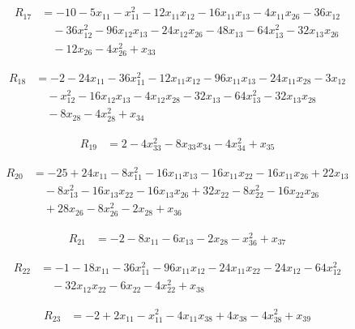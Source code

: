 \begin{align*}
R_{17} &= -10 -5 x_{11} -x_{11}^{2} -12 x_{11} x_{12} -16 x_{11} x_{13} -4 x_{11} x_{26} -36 x_{12} \\
&\quad -36 x_{12}^{2} -96 x_{12} x_{13} -24 x_{12} x_{26} -48 x_{13} -64 x_{13}^{2} -32 x_{13} x_{26} \\
&\quad -12 x_{26} -4 x_{26}^{2} +x_{33}
\end{align*}

\begin{align*}
R_{18} &= -2 -24 x_{11} -36 x_{11}^{2} -12 x_{11} x_{12} -96 x_{11} x_{13} -24 x_{11} x_{28} -3 x_{12} \\
&\quad -x_{12}^{2} -16 x_{12} x_{13} -4 x_{12} x_{28} -32 x_{13} -64 x_{13}^{2} -32 x_{13} x_{28} \\
&\quad -8 x_{28} -4 x_{28}^{2} +x_{34}
\end{align*}

\begin{align*}
R_{19} &= 2 -4 x_{33}^{2} -8 x_{33} x_{34} -4 x_{34}^{2} +x_{35}
\end{align*}

\begin{align*}
R_{20} &= -25 +24 x_{11} -8 x_{11}^{2} -16 x_{11} x_{13} -16 x_{11} x_{22} -16 x_{11} x_{26} +22 x_{13} \\
&\quad -8 x_{13}^{2} -16 x_{13} x_{22} -16 x_{13} x_{26} +32 x_{22} -8 x_{22}^{2} -16 x_{22} x_{26} \\
&\quad +28 x_{26} -8 x_{26}^{2} -2 x_{28} +x_{36}
\end{align*}

\begin{align*}
R_{21} &= -2 -8 x_{11} -6 x_{13} -2 x_{28} -x_{36}^{2} +x_{37}
\end{align*}

\begin{align*}
R_{22} &= -1 -18 x_{11} -36 x_{11}^{2} -96 x_{11} x_{12} -24 x_{11} x_{22} -24 x_{12} -64 x_{12}^{2} \\
&\quad -32 x_{12} x_{22} -6 x_{22} -4 x_{22}^{2} +x_{38}
\end{align*}

\begin{align*}
R_{23} &= -2 +2 x_{11} -x_{11}^{2} -4 x_{11} x_{38} +4 x_{38} -4 x_{38}^{2} +x_{39}
\end{align*}

